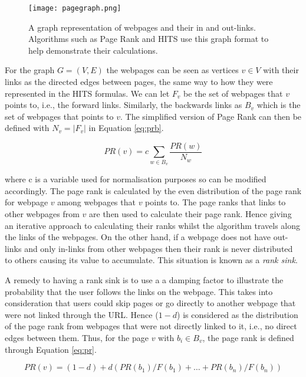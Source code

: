 \begin{figure}[!htb]
	\centering
	\texttt{[image: pagegraph.png]}
	\caption{A graph representation of webpages and their in and out-links. Algorithms such as Page Rank and HITS use this graph format to help demonstrate their calculations.}
	\label{fig:page}
\end{figure}

For the graph $G = (V, E)$ the webpages can be seen as vertices $v \in V$ with their links as the directed edges between pages, the same way to how they were represented in the HITS formulas. We can let $F_v$ be the set of webpages that $v$ points to, i.e., the forward links. Similarly, the backwards links as $B_v$ which is the set of webpages that points to $v$. The simplified version of Page Rank \cite{page1999pagerank} can then be defined with $N_v = \left|F_v\right|$ in Equation \ref{eq:prb}.

\begin{equation}\label{eq:prb}
PR(v) = c\sum_{w \in B_v}\frac{PR(w)}{N_w}
\end{equation}

where c is a variable used for normalisation purposes so can be modified accordingly. The page rank is calculated by the even distribution of the page rank for webpage $v$ among webpages that $v$ points to. The page ranks that links to other webpages from $v$ are then used to calculate their page rank. Hence giving an iterative approach to calculating their ranks whilst the algorithm travels along the links of the webpages. On the other hand, if a webpage does not have out-links and only in-links from other webpages then their rank is never distributed to others causing its value to accumulate. This situation is known as a \emph{rank sink}.

A remedy to having a rank sink is to use a a damping factor to illustrate the probability that the user follows the links on the webpage. This takes into consideration that users could skip pages or go directly to another webpage that were not linked through the URL. Hence ($1-d$) is considered as the distribution of the page rank from webpages that were not directly linked to it, i.e., no direct edges between them. Thus, for the page $v$ with $b_i \in B_v$, the page rank \cite{brin1998anatomy} is defined through Equation \ref{eq:pr}.

\begin{equation} \label{eq:pr}
PR(v) = (1-d) + d (PR(b_1)/F(b_1) + … + PR(b_n)/F(b_n))
\end{equation}

